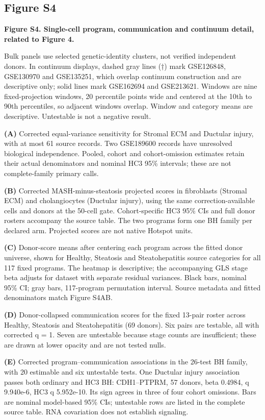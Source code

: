\subsection{Figure S4}\label{figure-s4}

\textbf{Figure S4. Single-cell program, communication and continuum detail, related to Figure 4.}

Bulk panels use selected genetic-identity clusters, not verified independent donors. In continuum displays, dashed gray lines (†) mark GSE126848, GSE130970 and GSE135251, which overlap continuum construction and are descriptive only; solid lines mark GSE162694 and GSE213621. Windows are nine fixed-projection windows, 20 percentile points wide and centered at the 10th to 90th percentiles, so adjacent windows overlap. Window and category means are descriptive. Untestable is not a negative result.

\textbf{(A)} Corrected equal-variance sensitivity for Stromal ECM and Ductular injury, with at most 61 source records. Two GSE189600 records have unresolved biological independence. Pooled, cohort and cohort-omission estimates retain their actual denominators and nominal HC3 95\% intervals; these are not complete-family primary calls.

\textbf{(B)} Corrected MASH-minus-steatosis projected scores in fibroblasts (Stromal ECM) and cholangiocytes (Ductular injury), using the same correction-available cells and donors at the 50-cell gate. Cohort-specific HC3 95\% CIs and full donor rosters accompany the source table. The two programs form one BH family per declared arm. Projected scores are not native Hotspot units.

\textbf{(C)} Donor-score means after centering each program across the fitted donor universe, shown for Healthy, Steatosis and Steatohepatitis source categories for all 117 fixed programs. The heatmap is descriptive; the accompanying GLS stage beta adjusts for dataset with separate residual variances. Black bars, nominal 95\% CI; gray bars, 117-program permutation interval. Source metadata and fitted denominators match Figure S4AB.

\textbf{(D)} Donor-collapsed communication scores for the fixed 13-pair roster across Healthy, Steatosis and Steatohepatitis (69 donors). Six pairs are testable, all with corrected q = 1. Seven are untestable because stage counts are insufficient; these are drawn at lower opacity and are not tested nulls.

\textbf{(E)} Corrected program--communication associations in the 26-test BH family, with 20 estimable and six untestable tests. One Ductular injury association passes both ordinary and HC3 BH: CDH1--PTPRM, 57 donors, beta 0.4984, q 9.940e-6, HC3 q 5.952e-10. Its sign agrees in three of four cohort omissions. Bars are nominal model-based 95\% CIs; untestable rows are listed in the complete source table. RNA covariation does not establish signaling.

